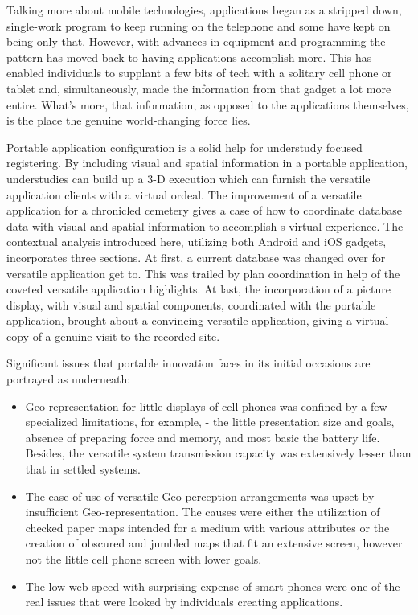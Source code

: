 Talking more about mobile technologies, applications began as a stripped down, single-work program to keep running on the telephone and some have kept on being only that. However, with advances in equipment and programming the pattern has moved back to having applications accomplish more. This has enabled individuals to supplant a few bits of tech with a solitary cell phone or tablet and, simultaneously, made the information from that gadget a lot more entire. What's more, that information, as opposed to the applications themselves, is the place the genuine world-changing force lies.

Portable application configuration is a solid help for understudy focused registering. By including visual and spatial information in a portable application, understudies can build up a 3-D execution which can furnish the versatile application clients with a virtual ordeal. The improvement of a versatile application for a chronicled cemetery gives a case of how to coordinate database data with visual and spatial information to accomplish s virtual experience. The contextual analysis introduced here, utilizing both Android and \gls{iOS} gadgets, incorporates three sections. At first, a current database was changed over for versatile application get to. This was trailed by plan coordination in help of the coveted versatile application highlights. At last, the incorporation of a picture display, with visual and spatial components, coordinated with the portable application, brought about a convincing versatile application, giving a virtual copy of a genuine visit to the recorded site.

Significant issues that portable innovation faces in its initial occasions are portrayed as underneath:

\begin{itemize}
  \item Geo-representation for little displays of cell phones was confined by a few specialized limitations, for example, - the little presentation size and goals, absence of preparing force and memory, and most basic the battery life. Besides, the versatile system transmission capacity was extensively lesser than that in settled systems.
  
  \item The ease of use of versatile Geo-perception arrangements was upset by insufficient Geo-representation. The causes were either the utilization of checked paper maps intended for a medium with various attributes or the creation of obscured and jumbled maps that fit an extensive screen, however not the little cell phone screen with lower goals.
  
  \item The low web speed with surprising expense of smart phones were one of the real issues that were looked by individuals creating applications.
\end{itemize}

